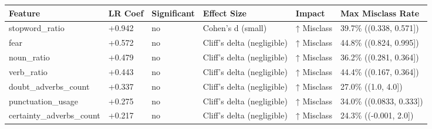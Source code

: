 \begin{tabular}{llllll}
\toprule
Feature & LR Coef & Significant & Effect Size & Impact & Max Misclass Rate \\
\midrule
stopword\_ratio & +0.942 & no & Cohen's d (small) & ↑ Misclass & 39.7\% ((0.338, 0.571]) \\
fear & +0.572 & no & Cliff's delta (negligible) & ↑ Misclass & 44.8\% ((0.824, 0.995]) \\
noun\_ratio & +0.479 & no & Cliff's delta (negligible) & ↑ Misclass & 36.2\% ((0.281, 0.364]) \\
verb\_ratio & +0.443 & no & Cliff's delta (negligible) & ↑ Misclass & 44.4\% ((0.167, 0.364]) \\
doubt\_adverbs\_count & +0.337 & no & Cliff's delta (negligible) & ↑ Misclass & 27.0\% ((1.0, 4.0]) \\
punctuation\_usage & +0.275 & no & Cliff's delta (negligible) & ↑ Misclass & 34.0\% ((0.0833, 0.333]) \\
certainty\_adverbs\_count & +0.217 & no & Cliff's delta (negligible) & ↑ Misclass & 24.3\% ((-0.001, 2.0]) \\
\bottomrule
\end{tabular}
